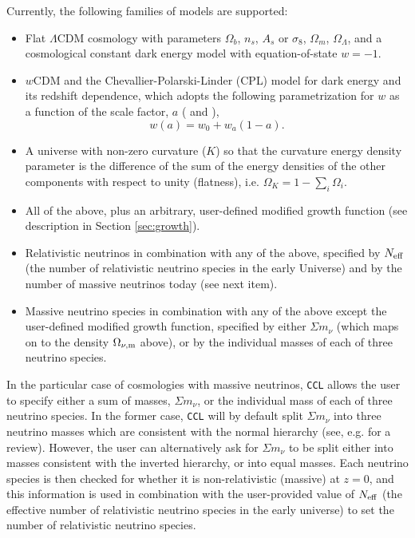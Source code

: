 \documentclass[\docopts]{\docclass}
\newcommand{\ccl}{{\tt CCL}\xspace}
\begin{document}
Currently, the following families of models are supported:
\begin{itemize}
 \item Flat $\Lambda$CDM cosmology with parameters $\Omega_b$, $n_s$, $A_s$ or $\sigma_8$, $\Omega_m$, $\Omega_\Lambda$, and a cosmological constant dark energy model with equation-of-state $w=-1$. 
\item $w$CDM and the Chevallier-Polarski-Linder (CPL) model for dark energy and its redshift dependence, which adopts the following parametrization for $w$ as a function of the scale factor, $a$ (\citealt{Chevallier01} and \citealt{Linder03}),
  \begin{equation}
    w(a) = w_0+w_a(1-a).
  \end{equation}
 \item A universe with non-zero curvature ($K$) so that the curvature energy density parameter is the difference of the sum of the energy densities of the other components with respect to unity (flatness), i.e. $\Omega_K = 1- \sum_i \Omega_i$.
 \item All of the above, plus an arbitrary, user-defined modified growth function (see description in Section \ref{sec:growth}).
 \item Relativistic neutrinos in combination with any of the above, specified by $N_{\rm eff}$ (the number of relativistic neutrino species in the early Universe) and by the number of massive neutrinos today (see next item).
  \item Massive neutrino species in combination with any of the above except the user-defined modified growth function, specified by either $\Sigma m_\nu$ (which maps on to the density $\Omega_{\nu, {\rm m}}$ above), or by the individual masses of each of three neutrino species.
\end{itemize}

In the particular case of cosmologies with massive neutrinos, \ccl allows the user to specify either a sum of masses, $\Sigma m_\nu$, or the individual mass of each of three neutrino species. In the former case, \ccl will by default split $\Sigma m_\nu$ into three neutrino masses which are consistent with the normal hierarchy (see, e.g. \cite{Gerbino2017} for a review). However, the user can alternatively ask for $\Sigma m_\nu$ to be split either into masses consistent with the inverted hierarchy, or into equal masses. Each neutrino species is then checked for whether it is non-relativistic (massive) at $z=0$, and this information is used in combination with the user-provided value of $N_{\rm eff}$ (the effective number of relativistic neutrino species in the early universe) to set the number of relativistic neutrino species.
\end{document}
